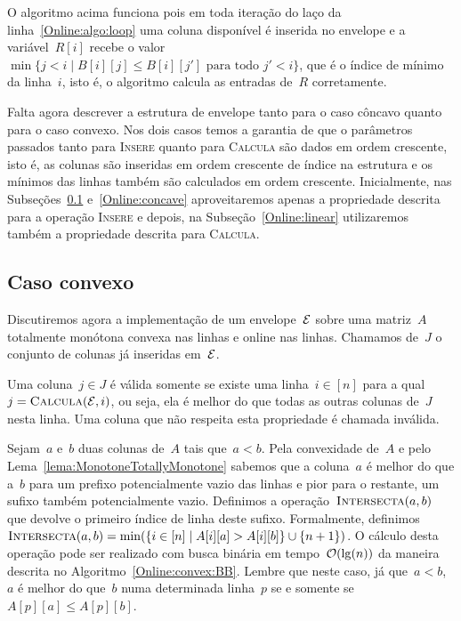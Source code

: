 O algoritmo acima funciona pois em toda iteração do laço da linha~\ref{Online:algo:loop} uma coluna disponível é inserida no envelope e a variável~$R[i]$ recebe o valor~$\min\{ j < i \mid B[i][j] \leq B[i][j'] \text{ para todo } j' < i\}$, que é o índice de mínimo da linha~$i$, isto é, o algoritmo calcula as entradas de~$R$ corretamente.

Falta agora descrever a estrutura de envelope tanto para o caso côncavo quanto para o caso convexo. Nos dois casos temos a garantia de que o parâmetros passados tanto para \textsc{Insere} quanto para \textsc{Calcula} são dados em ordem crescente, isto é, as colunas são inseridas em ordem crescente de índice na estrutura e os mínimos das linhas também são calculados em ordem crescente. Inicialmente, nas Subseções~\ref{Online:convex} e~\ref{Online:concave} aproveitaremos apenas a propriedade descrita para a operação \textsc{Insere} e depois, na Subseção~\ref{Online:linear} utilizaremos também a propriedade descrita para \textsc{Calcula}.


\subsection{Caso convexo} \label{Online:convex}
Discutiremos agora a implementação de um envelope~$\mathcal{E}$ sobre uma matriz~$A$ totalmente monótona convexa nas linhas e online nas linhas. Chamamos de~$J$ o conjunto de colunas já inseridas em~$\mathcal{E}$.

\begin{defi}
Uma coluna~$j \in J$ é válida somente se existe uma linha~$i \in [n]$ para a qual~${j = \textsc{Calcula}(\mathcal{E},i)}$, ou seja, ela é melhor do que todas as outras colunas de~$J$ nesta linha. Uma coluna que não respeita esta propriedade é chamada inválida.
\end{defi}

Sejam~$a$ e~$b$ duas colunas de~$A$ tais que~$a < b$. Pela convexidade de~$A$ e pelo Lema~\ref{lema:MonotoneTotallyMonotone} sabemos que a coluna~$a$ é melhor do que a~$b$ para um prefixo potencialmente vazio das linhas e pior para o restante, um sufixo também potencialmente vazio. Definimos a operação~$\textsc{Intersecta}(a,b)$ que devolve o primeiro índice de linha deste sufixo. Formalmente, definimos~${\textsc{Intersecta}(a,b) = \min(\{ i \in [n] \mid A[i][a] > A[i][b] \} \cup \{n+1\})}$. O cálculo desta operação pode ser realizado com busca binária em tempo~$\mathcal{O}(\lg(n))$ da maneira descrita no Algoritmo~\ref{Online:convex:BB}. Lembre que neste caso, já que~$a < b$,~$a$ é melhor do que~$b$ numa determinada linha~$p$ se e somente se~${A[p][a] \leq A[p][b]}$.

